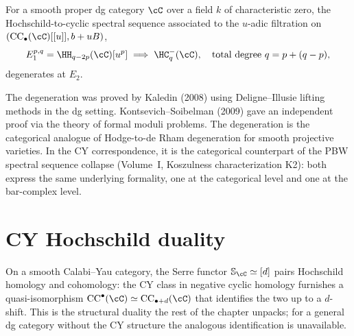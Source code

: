 \begin{proposition}
\label{prop:hodge-dR-degeneration}
For a smooth proper dg category $\cC$ over a field $k$ of
characteristic zero, the Hochschild-to-cyclic spectral sequence associated to the $u$-adic filtration on $(\mathrm{CC}_\bullet(\cC)[[u]], b + uB)$,
\[
 E_1^{p,q} = \HH_{q-2p}(\cC)[u^p] \;\Longrightarrow\; \HC^-_q(\cC),\quad\text{total degree }q = p + (q-p),
\]
degenerates at $E_2$.
\end{proposition}

\begin{remark}
\label{rem:kaledin}
The degeneration was proved by Kaledin (2008) using Deligne--Illusie
lifting methods in the dg setting. Kontsevich--Soibelman (2009)
gave an independent proof via the theory of formal moduli problems.
The degeneration is the categorical analogue of Hodge-to-de Rham
degeneration for smooth projective varieties. In the CY correspondence,
it is the categorical counterpart of the PBW spectral sequence
collapse (Volume~I, Koszulness characterization K2): both express
the same underlying formality, one at the categorical level and one
at the bar-complex level.
\end{remark}


\section{CY Hochschild duality}
\label{sec:cy-hh-duality}

On a smooth Calabi--Yau category, the Serre functor $\mathbb{S}_\cC \simeq [d]$ pairs Hochschild homology and cohomology: the CY class in negative cyclic homology furnishes a quasi-isomorphism $\mathrm{CC}^\bullet(\cC) \simeq \mathrm{CC}_{\bullet + d}(\cC)$ that identifies the two up to a $d$-shift. This is the structural duality the rest of the chapter unpacks; for a general dg category without the CY structure the analogous identification is unavailable.

